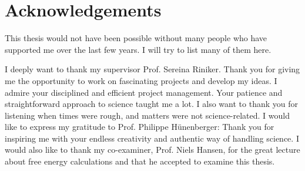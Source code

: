 \chapter{Acknowledgements}
This thesis would not have been possible without many people who have
supported me over the last few years. I will try to list many of them here.

I deeply want to thank my supervisor Prof. Sereina Riniker. Thank you for giving me the opportunity to work on fascinating projects and develop my ideas. I admire your disciplined and efficient project management. Your patience and straightforward approach to science taught me a lot. I also want to thank you for listening when times were rough, and matters were not science-related.
I would like to express my gratitude to Prof. Philippe H{\"u}nenberger: Thank you for inspiring me with your endless creativity and authentic way of handling science.
I would also like to thank my co-examiner, Prof. Niels Hansen, for the great lecture about free energy calculations and that he accepted to examine this thesis.


